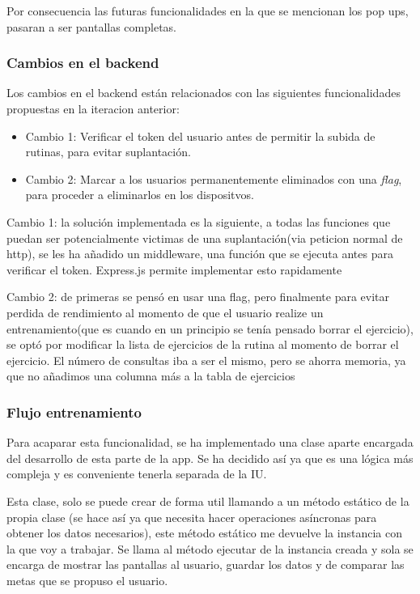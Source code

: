Por consecuencia las futuras funcionalidades en la que se mencionan los pop ups, pasaran a ser pantallas completas.

\subsubsection{Cambios en el backend}

Los cambios en el backend están relacionados con las siguientes funcionalidades propuestas en la iteracion anterior:

\begin{itemize}
	\item Cambio 1: Verificar el token del usuario antes de permitir la subida de rutinas, para evitar suplantación.
  	\item Cambio 2: Marcar a los usuarios permanentemente eliminados con una \textit{flag}, para proceder a eliminarlos en los dispositvos.
\end{itemize}

Cambio 1: la solución implementada es la siguiente, a todas las funciones que puedan ser potencialmente victimas de una suplantación(via peticion normal de http), se les ha añadido un middleware, una función que se ejecuta antes para verificar el token. Express.js permite implementar esto rapidamente

Cambio 2: de primeras se pensó en usar una flag, pero finalmente para evitar perdida de rendimiento al momento de que el usuario realize un entrenamiento(que es cuando en un principio se tenía pensado borrar el ejercicio), se optó por modificar la lista de ejercicios de la rutina al momento de borrar el ejercicio. El número de consultas iba a ser el mismo, pero se ahorra memoria, ya que no añadimos una columna más a la tabla de ejercicios

\subsubsection{Flujo entrenamiento}

Para acaparar esta funcionalidad, se ha implementado una clase aparte encargada del desarrollo de esta parte de la app. Se ha decidido así ya que es una lógica más compleja y es conveniente tenerla separada de la IU.

Esta clase, solo se puede crear de forma util llamando a un método estático de la propia clase (se hace así ya que necesita hacer operaciones asíncronas para obtener los datos necesarios), este método estático me devuelve la instancia con la que voy a trabajar. Se llama al método ejecutar de la instancia creada y sola se encarga de mostrar las pantallas al usuario, guardar los datos y de comparar las metas que se propuso el usuario.


